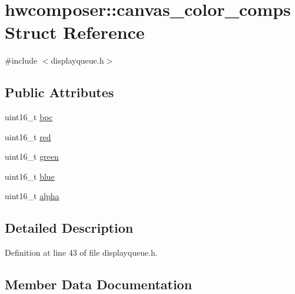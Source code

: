 \hypertarget{structhwcomposer_1_1canvas__color__comps}{}\section{hwcomposer\+:\+:canvas\+\_\+color\+\_\+comps Struct Reference}
\label{structhwcomposer_1_1canvas__color__comps}


{\ttfamily \#include $<$displayqueue.\+h$>$}

\subsection*{Public Attributes}
\begin{DoxyCompactItemize}
\item 
uint16\+\_\+t \mbox{\hyperlink{structhwcomposer_1_1canvas__color__comps_acc36ffbe065c257719324261a5132a34}{bpc}}
\item 
uint16\+\_\+t \mbox{\hyperlink{structhwcomposer_1_1canvas__color__comps_a1fe32ff54751b722cf22aa5552bbf639}{red}}
\item 
uint16\+\_\+t \mbox{\hyperlink{structhwcomposer_1_1canvas__color__comps_ac32b9c45f1b36efde1daf1ff611f91a2}{green}}
\item 
uint16\+\_\+t \mbox{\hyperlink{structhwcomposer_1_1canvas__color__comps_a27ec3e90465f37afc780b4667553c476}{blue}}
\item 
uint16\+\_\+t \mbox{\hyperlink{structhwcomposer_1_1canvas__color__comps_aa3bc7ed2376661512398ec6be09bde4e}{alpha}}
\end{DoxyCompactItemize}


\subsection{Detailed Description}


Definition at line 43 of file displayqueue.\+h.



\subsection{Member Data Documentation}
\mbox{\label{structhwcomposer_1_1canvas__color__comps_aa3bc7ed2376661512398ec6be09bde4e}} 
